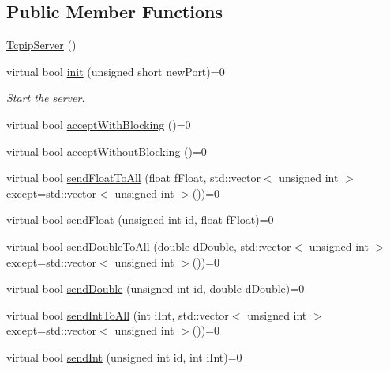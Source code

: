 \subsection*{Public Member Functions}
\begin{DoxyCompactItemize}
\item 
\hyperlink{class_rad_j_a_v_1_1_networking_1_1_tcpip_server_ad7121698db184467e9439fe062b5d35a}{Tcpip\+Server} ()
\item 
virtual bool \hyperlink{class_rad_j_a_v_1_1_networking_1_1_tcpip_server_a3d67bcb55aae5c4cc937113c2def86b9}{init} (unsigned short new\+Port)=0
\begin{DoxyCompactList}\small\item\em Start the server. \end{DoxyCompactList}\item 
virtual bool \hyperlink{class_rad_j_a_v_1_1_networking_1_1_tcpip_server_a53555ae267a5f3d6ac8aafbb7a567ee9}{accept\+With\+Blocking} ()=0
\item 
virtual bool \hyperlink{class_rad_j_a_v_1_1_networking_1_1_tcpip_server_a3d7ea19180509cffa6d4ee802767ca90}{accept\+Without\+Blocking} ()=0
\item 
virtual bool \hyperlink{class_rad_j_a_v_1_1_networking_1_1_tcpip_server_a010c397f06fd6b6344fed2957082cc94}{send\+Float\+To\+All} (float f\+Float, std\+::vector$<$ unsigned int $>$ except=std\+::vector$<$ unsigned int $>$())=0
\item 
virtual bool \hyperlink{class_rad_j_a_v_1_1_networking_1_1_tcpip_server_af853c22dbaed2cebcfa9eb434bf0bca3}{send\+Float} (unsigned int id, float f\+Float)=0
\item 
virtual bool \hyperlink{class_rad_j_a_v_1_1_networking_1_1_tcpip_server_a898cff16cd54978e362100333e29fb50}{send\+Double\+To\+All} (double d\+Double, std\+::vector$<$ unsigned int $>$ except=std\+::vector$<$ unsigned int $>$())=0
\item 
virtual bool \hyperlink{class_rad_j_a_v_1_1_networking_1_1_tcpip_server_a0fd3de45f41e253be2228f18f244853d}{send\+Double} (unsigned int id, double d\+Double)=0
\item 
virtual bool \hyperlink{class_rad_j_a_v_1_1_networking_1_1_tcpip_server_a50b7f5fd03623836a5ee82e8389ed66f}{send\+Int\+To\+All} (int i\+Int, std\+::vector$<$ unsigned int $>$ except=std\+::vector$<$ unsigned int $>$())=0
\item 
virtual bool \hyperlink{class_rad_j_a_v_1_1_networking_1_1_tcpip_server_a815323e68b2d921e324292295a9fcb67}{send\+Int} (unsigned int id, int i\+Int)=0

\end{DoxyCompactItemize}
